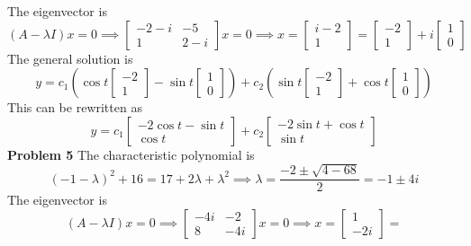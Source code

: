 The eigenvector is 
\[
    (A-\lambda I)x=0 \implies 
    \begin{bmatrix}
        -2-i & -5 \\
        1 & 2-i
    \end{bmatrix} x = 0 \implies
    x = 
    \begin{bmatrix}
        i-2 \\ 1
    \end{bmatrix} = 
    \begin{bmatrix}
        -2 \\ 1
    \end{bmatrix} +
    i
    \begin{bmatrix}
        1 \\ 0
    \end{bmatrix} 
\]
The general solution is 
\[
    y = c_1\left(\cos t \begin{bmatrix} -2 \\ 1 \end{bmatrix} 
          - \sin t \begin{bmatrix} 1 \\ 0 \end{bmatrix}\right) +
        c_2\left(\sin t \begin{bmatrix} -2 \\ 1 \end{bmatrix} 
          + \cos t \begin{bmatrix} 1 \\ 0 \end{bmatrix}\right) 
\]
This can be rewritten as 
\[
    y = c_1 
    \begin{bmatrix}
        -2\cos t - \sin t \\
        \cos t
    \end{bmatrix} +
    c_2 
    \begin{bmatrix}
        -2\sin t + \cos t \\
        \sin t
    \end{bmatrix}
\]
\textbf{Problem 5}
The characteristic polynomial is 
\[
    (-1-\lambda)^2 + 16
    = 17 + 2\lambda + \lambda^2
    \implies \lambda = 
    \frac{-2 \pm \sqrt{4-68}}{2} =
    -1 \pm 4i
\]
The eigenvector is 
\[
    (A-\lambda I)x=0 \implies 
    \begin{bmatrix}
        -4i & -2 \\
        8 & -4i
    \end{bmatrix} x = 0 \implies
    x = 
    \begin{bmatrix}
        1 \\ -2i
    \end{bmatrix} = 
\]
